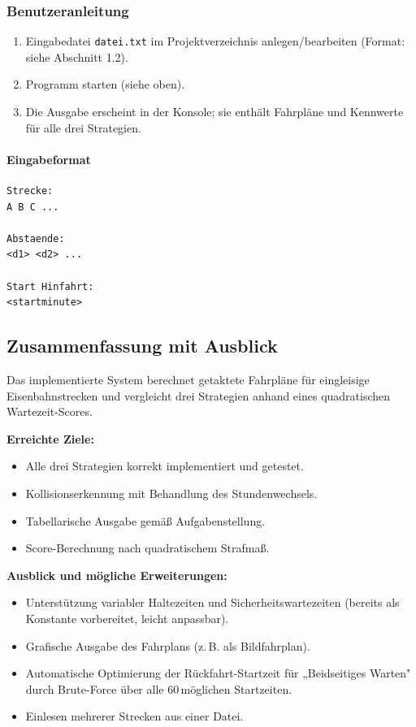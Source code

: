 \documentclass[12pt,a4paper]{article}
\begin{document}
\subsubsection{Benutzeranleitung}

\begin{enumerate}
  \item Eingabedatei \texttt{datei.txt} im Projektverzeichnis anlegen/bearbeiten
        (Format: siehe Abschnitt 1.2).
  \item Programm starten (siehe oben).
  \item Die Ausgabe erscheint in der Konsole; sie enthält Fahrpläne und Kennwerte
        für alle drei Strategien.
\end{enumerate}

\paragraph{Eingabeformat}
\begin{lstlisting}
Strecke:
A B C ...

Abstaende:
<d1> <d2> ...

Start Hinfahrt:
<startminute>
\end{lstlisting}

\subsection{Zusammenfassung mit Ausblick}

Das implementierte System berechnet getaktete Fahrpläne für eingleisige
Eisenbahnstrecken und vergleicht drei Strategien anhand eines quadratischen
Warte\-zeit-Scores.

\medskip
\noindent
\textbf{Erreichte Ziele:}
\begin{itemize}
  \item Alle drei Strategien korrekt implementiert und getestet.
  \item Kollisionserkennung mit Behandlung des Stundenwechsels.
  \item Tabellarische Ausgabe gemäß Aufgabenstellung.
  \item Score-Berechnung nach quadratischem Strafmaß.
\end{itemize}

\noindent
\textbf{Ausblick und mögliche Erweiterungen:}
\begin{itemize}
  \item Unterstützung variabler Haltezeiten und Sicherheitswartezeiten
        (bereits als Konstante vorbereitet, leicht anpassbar).
  \item Grafische Ausgabe des Fahrplans (z.\,B. als Bildfahrplan).
  \item Automatische Optimierung der Rückfahrt-Startzeit für
        „Beidseitiges Warten" durch Brute-Force über alle 60\,möglichen
        Startzeiten.
  \item Einlesen mehrerer Strecken aus einer Datei.
\end{itemize}
\end{document}
